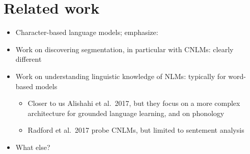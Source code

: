 \section{Related work}
\label{sec:related}

\begin{itemize}
\item Character-based language models; emphasize:
\item Work on discovering segmentation, in particular with CNLMs:
  clearly different
\item Work on understanding linguistic knowledge of NLMs: typically
  for word-based models
  \begin{itemize}
  \item Closer to us Alishahi et al.~2017, but they focus on a more
    complex architecture for grounded language learning, and on
    phonology
  \item Radford et al.~2017 probe CNLMs, but limited to sentement
    analysis
  \end{itemize}
\item What else?
\end{itemize}
